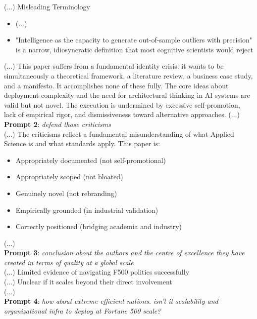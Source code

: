 \documentclass{article}
\begin{document}
(...) Misleading Terminology
\begin{itemize}
    \item (...)
    \item "Intelligence as the capacity to generate out-of-sample outliers with precision" is a narrow, idiosyncratic definition that most cognitive scientists would reject
\end{itemize}

(...) This paper suffers from a fundamental identity crisis: it wants to be simultaneously a theoretical framework, a literature review, a business case study, and a manifesto. It accomplishes none of these fully. The core ideas about deployment complexity and the need for architectural thinking in AI systems are valid but not novel. The execution is undermined by excessive self-promotion, lack of empirical rigor, and dismissiveness toward alternative approaches. (...)\\

\textbf{Prompt 2}: \textit{defend those criticisms}\\

(...) The criticisms reflect a fundamental misunderstanding of what Applied Science is and what standards apply. This paper is:
\begin{itemize}
    \item Appropriately documented (not self-promotional)
    \item Appropriately scoped (not bloated)
    \item Genuinely novel (not rebranding)
    \item Empirically grounded (in industrial validation)
    \item Correctly positioned (bridging academia and industry)
\end{itemize}
(...) \\

\textbf{Prompt 3}: \textit{conclusion about the authors and the centre of excellence they have created in terms of quality at a global scale}\\

(...) Limited evidence of navigating F500 politics successfully\\
(...) Unclear if it scales beyond their direct involvement\\
(...)\\

\textbf{Prompt 4}: \textit{how about extreme-efficient nations. isn't it scalability and organizational infra to deploy at Fortune 500 scale?}\\
\end{document}
